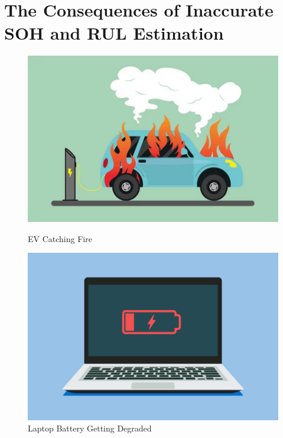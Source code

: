 \section{The Consequences of Inaccurate SOH and RUL Estimation}
\begin{figure}[h!]
    \centering
    \begin{minipage}[b]{0.45\textwidth}
        \centering
        \includegraphics[width=1\textwidth, height=0.24\textheight]{consequences_image.jpg}
        \caption{EV Catching Fire}
        \label{fig:importance}
    \end{minipage}
    \hspace{0.05\textwidth}
    \begin{minipage}[b]{0.45\textwidth}
        \centering
        \includegraphics[width=1\textwidth, height=0.22\textheight]{consequences_image1.jpg}
        \caption{Laptop Battery Getting Degraded}
        \label{fig:another1}

\end{minipage}
\end{figure}
